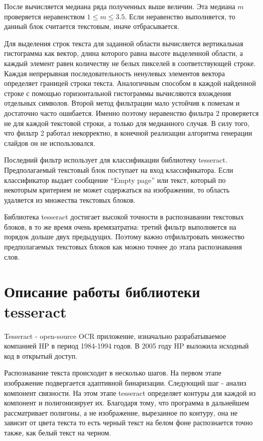\documentclass[oneside,final,14pt]{extreport}
\begin{document}
После вычисляется медиана ряда полученных выше величин. Эта медиана $m$ проверяется неравенством
$1 \leq m \leq 3.5$. Если неравенство выполняется, то данный блок считается текстовым, иначе отбрасывается. 

Для выделения строк текста для заданной области вычисляется вертикальная гистограмма как вектор, длина которого равна высоте выделенной области, а каждый элемент равен количеству не белых пикселей в соответствующей строке. Каждая непрерывная последовательность ненулевых элементов вектора определяет границей строки текста. Аналогичным способом в каждой найденной строке с помощью горизонтальной гистограммы вычисляются вхождения отдельных символов. Второй метод фильтрации мало устойчив к помехам и достаточно часто ошибается. Именно поэтому неравенство фильтра 2 проверяется не для каждой текстовой строки, а только для медианного случая. В силу того, что фильтр 2 работал некорректно, в конечной реализации алгоритма генерации слайдов он не использовался.

Последний фильтр использует для классификации библиотеку tesseract. Предполагаемый текстовый блок поступает на вход классификатора.  Если классификатор выдает сообщение “Empty page” или текст, который по некоторым критерием не может содержаться на изображении, то область удаляется из множества текстовых блоков. 

Библиотека tesseract достигает высокой точности в распознавании текстовых блоков, в то же время очень времязатратна: третий фильтр выполняется на порядок дольше двух предыдущих. Поэтому важно отфильтровать множество предполагаемых текстовых блоков как можно точнее до этапа распознавания слов.

\section{Описание работы библиотеки tesseract}

Tesseract - open-source OCR приложение, изначально разрабатываемое компанией HP в период 1984-1994 годов. В 2005 году HP выложила исходный код  в открытый доступ\cite{Smith:Tesseract}. 

Распознавание текста происходит в несколько шагов. На первом этапе изображение подвергается адаптивной бинаризации. Следующий шаг - анализ компонент связности. На этом этапе tesseract определяет контуры для каждой из компонент и полигонизирует их. Благодаря тому, что программа в дальнейшем рассматривает полигоны, а не изображение, вырезанное по контуру, она не зависит от цвета текста то есть черный текст на белом фоне распознается точно также, как белый текст на черном. 
\end{document}
